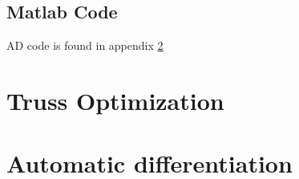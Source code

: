\documentclass[a4paper]{article}
\begin{document}
\subsection{Matlab Code}
AD code is found in appendix \ref{appendix.adcode}
\appendix
\section{Truss Optimization}
\label{appendix.trussCode}
 
\section{Automatic differentiation}
 
\label{appendix.adcode}
\end{document}
